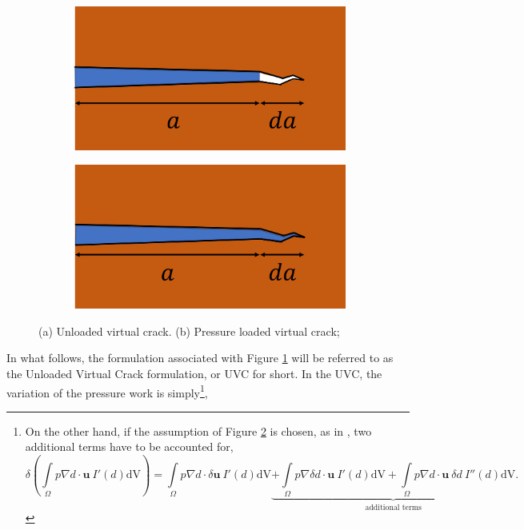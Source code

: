 \begin{figure}[h]
\bigskip
\begin{subfigure}{.49\textwidth}
  \centering
  \includegraphics[width=0.7\linewidth]{images/theory_part/dry_crack.png}
  \caption{}
  \label{fig:dry_crack}
\end{subfigure}%
\begin{subfigure}{.49\textwidth}
  \centering
  \includegraphics[width=0.7\linewidth]{images/theory_part/wet_crack.png}
  \caption{}
  \label{fig:wet_crack}
\end{subfigure}%
  \caption{(a) Unloaded virtual crack. (b) Pressure loaded virtual crack;} 
  \label{fig:wet_vs_dry_crack}
\end{figure}

In what follows, the formulation associated with Figure \ref{fig:dry_crack} will be referred to as the Unloaded Virtual Crack formulation, or UVC for short. In the UVC, the variation of the pressure work is simply\footnote{\noindent On the other hand, if the assumption of Figure \ref{fig:wet_crack} is chosen, as in \cite{bourdin2012variational}, two additional terms have to be accounted for, \begin{equation*}\label{wet variation}
    \delta \left( \int\limits_{\Omega} p \nabla d\cdot\textbf{u}\ I'(d)\text{dV} \right) = \int\limits_{\Omega} p \nabla d\cdot\delta\textbf{u}\ I'(d)\text{dV} \underbrace{+ \int\limits_{\Omega} p \nabla \delta d\cdot\textbf{u}\ I'(d)\text{dV} + \int\limits_{\Omega} p \nabla d\cdot\textbf{u}\ \delta d\ I''(d)\text{dV}}_{\text{additional terms}}.
\end{equation*}},

